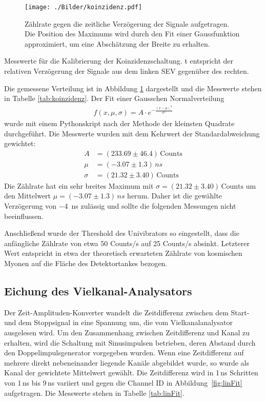 \begin{figure}[htbp]
	\texttt{[image: ./Bilder/koinzidenz.pdf]}
	\caption{Zählrate gegen die zeitliche Verzögerung der Signale aufgetragen. Die Position des Maximums wird durch den Fit einer Gaussfunktion approximiert, um eine Abschätzung der Breite zu erhalten.}
	\label{fig:koinzidenz}
\end{figure}

\begin{table}[htbp]
	
	\caption{Messwerte für die Kalibrierung der Koinzidenzschaltung. t entspricht der relativen Verzögerung der Signale aus dem linken SEV gegenüber des rechten.}
	\label{tab:koinzidenz}
\end{table}

Die gemessene Verteilung ist in Abbildung \ref{fig:koinzidenz} dargestellt und die Messwerte stehen in Tabelle \ref{tab:koinzidenz}. Der Fit einer Gausschen Normalverteilung
\begin{align}
	f(x,\mu,\sigma) = A\cdot e^{-\frac{(x-\mu)^2}{\sigma^2}}
\end{align}
wurde mit einem Pythonskript nach der Methode der kleinsten Quadrate durchgeführt. Die Messwerte wurden mit dem Kehrwert der Standardabweichung gewichtet:
\begin{align}
A &= (233.69 \pm 46.4)\,\text{Counts}\\
\mu &= (-3.07 \pm 1.3)\,\si{ns}\\
\sigma &= ({21.32} \pm 3.40)\,\si{\text{Counts}}
\end{align}
Die Zählrate hat ein sehr breites Maximum mit $\sigma = ({21.32} \pm 3.40)\,\si{\text{Counts}}$ um den Mittelwert $\mu = (-3.07 \pm 1.3)\,\si{ns}$ herum. Daher ist die gewählte Verzögerung von \SI{-4}{ns} zulässig und sollte die folgenden Messungen nicht beeinflussen.

Anschließend wurde der Threshold des Univibrators so eingestellt, dass die anfängliche Zählrate von etwa 50 Counts/s auf 25 Counts/s absinkt. Letzterer Wert entspricht in etwa der theoretisch erwarteten Zählrate von kosmischen Myonen auf die Fläche des Detektortankes bezogen.

\subsection{Eichung des Vielkanal-Analysators}
Der Zeit-Amplituden-Konverter wandelt die Zeitdifferenz zwischen dem Start- und dem Stoppsignal in eine Spannung um, die vom Vielkanalanalysator ausgelesen wird. Um den Zusammenhang zwischen Zeitdifferenz und Kanal zu erhalten, wird die Schaltung mit Sinusimpulsen betrieben, deren Abstand durch den Doppelimpulsgenerator vorgegeben wurden. Wenn eine Zeitdifferenz auf mehrere direkt nebeneinander liegende Kanäle abgebildet wurde, so wurde als Kanal der gewichtete Mittelwert gewählt. Die Zeitdifferenz wird in 1\,\si{ns} Schritten von 1\,ns bis 9\,ns variiert und gegen die Channel ID in \mbox{Abbildung \ref{fig:linFit}} aufgetragen. Die Messwerte stehen in Tabelle \ref{tab:linFit}.

